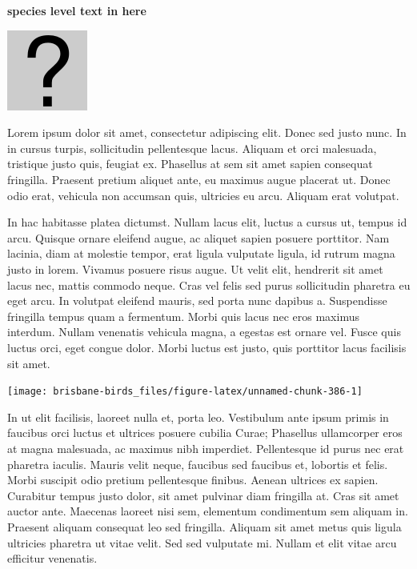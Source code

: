 \documentclass[]{book}
\let\origfigure\figure
\let\endorigfigure\endfigure
\renewenvironment{figure}[1][2] {
  \expandafter\origfigure\expandafter[H]
} {
  \endorigfigure
}
\begin{document}
\textbf{species level text in here}

\begin{figure}
\centering
\includegraphics{assets/missing.png}
\caption{No image for species}
\end{figure}

Lorem ipsum dolor sit amet, consectetur adipiscing elit. Donec sed justo
nunc. In in cursus turpis, sollicitudin pellentesque lacus. Aliquam et
orci malesuada, tristique justo quis, feugiat ex. Phasellus at sem sit
amet sapien consequat fringilla. Praesent pretium aliquet ante, eu
maximus augue placerat ut. Donec odio erat, vehicula non accumsan quis,
ultricies eu arcu. Aliquam erat volutpat.

In hac habitasse platea dictumst. Nullam lacus elit, luctus a cursus ut,
tempus id arcu. Quisque ornare eleifend augue, ac aliquet sapien posuere
porttitor. Nam lacinia, diam at molestie tempor, erat ligula vulputate
ligula, id rutrum magna justo in lorem. Vivamus posuere risus augue. Ut
velit elit, hendrerit sit amet lacus nec, mattis commodo neque. Cras vel
felis sed purus sollicitudin pharetra eu eget arcu. In volutpat eleifend
mauris, sed porta nunc dapibus a. Suspendisse fringilla tempus quam a
fermentum. Morbi quis lacus nec eros maximus interdum. Nullam venenatis
vehicula magna, a egestas est ornare vel. Fusce quis luctus orci, eget
congue dolor. Morbi luctus est justo, quis porttitor lacus facilisis sit
amet.

\begin{figure}
\texttt{[image: brisbane-birds\_files/figure-latex/unnamed-chunk-386-1]} \caption{insert figure caption}\label{fig:unnamed-chunk-386}
\end{figure}

In ut elit facilisis, laoreet nulla et, porta leo. Vestibulum ante ipsum
primis in faucibus orci luctus et ultrices posuere cubilia Curae;
Phasellus ullamcorper eros at magna malesuada, ac maximus nibh
imperdiet. Pellentesque id purus nec erat pharetra iaculis. Mauris velit
neque, faucibus sed faucibus et, lobortis et felis. Morbi suscipit odio
pretium pellentesque finibus. Aenean ultrices ex sapien. Curabitur
tempus justo dolor, sit amet pulvinar diam fringilla at. Cras sit amet
auctor ante. Maecenas laoreet nisi sem, elementum condimentum sem
aliquam in. Praesent aliquam consequat leo sed fringilla. Aliquam sit
amet metus quis ligula ultricies pharetra ut vitae velit. Sed sed
vulputate mi. Nullam et elit vitae arcu efficitur venenatis.
\end{document}
